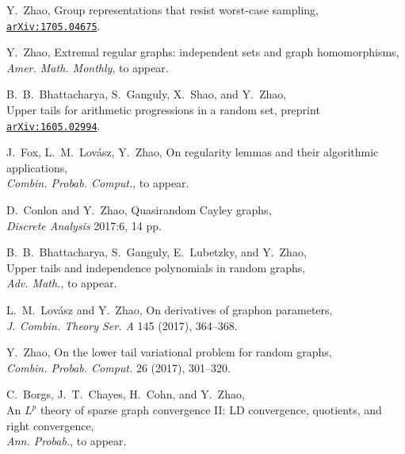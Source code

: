 \documentclass[11pt]{amsart}
\newcommand{\arXiv}[1]{\href{http://arxiv.org/abs/#1}{\tt arXiv:#1}}
\renewcommand{\j}[1]{{\frenchspacing\itshape #1}}
\begin{document}
\begin{etaremune}[leftmargin=0.3in,itemsep=4pt,topsep=0pt,partopsep=0pt,parsep=0pt]

\item Y.~Zhao, Group representations that resist worst-case sampling, \arXiv{1705.04675}.

\item Y.~Zhao, Extremal regular graphs: independent sets and graph homomorphisms, \\
  \j{Amer. Math. Monthly}, to appear.

\item B.~B.~Bhattacharya, S.~Ganguly, X.~Shao, and Y.~Zhao, \\ 
  Upper tails for arithmetic progressions in a random set, 
  preprint \arXiv{1605.02994}.

\item J.~Fox, L.~M.~Lov\'asz, Y.~Zhao,
  On regularity lemmas and their algorithmic applications, \\
  \j{Combin. Probab. Comput.}, to appear.
	
\item D.~Conlon and Y.~Zhao,
  Quasirandom Cayley graphs, \\
  \j{Discrete Analysis} 2017:6, 14 pp.

\item B.~B.~Bhattacharya, S.~Ganguly, E.~Lubetzky, and Y.~Zhao, \\
  Upper tails and independence polynomials in random graphs,
  \\
  \j{Adv. Math.}, to appear. 

\item L.~M.~Lov\'asz and Y.~Zhao,
  On derivatives of graphon parameters, \\
  \j{J. Combin. Theory Ser. A} 145 (2017), 364--368.

\item Y.~Zhao,
  On the lower tail variational problem for random graphs, \\
  \j{Combin. Probab. Comput.} 26 (2017), 301--320.

\item C.~Borgs, J.~T.~Chayes, H.~Cohn, and Y.~Zhao, \\
  An $L^p$ theory of sparse graph convergence II:
  LD convergence, quotients, and right convergence, 
  \\
  \j{Ann. Probab.}, to appear.


\end{etaremune}
\end{document}
